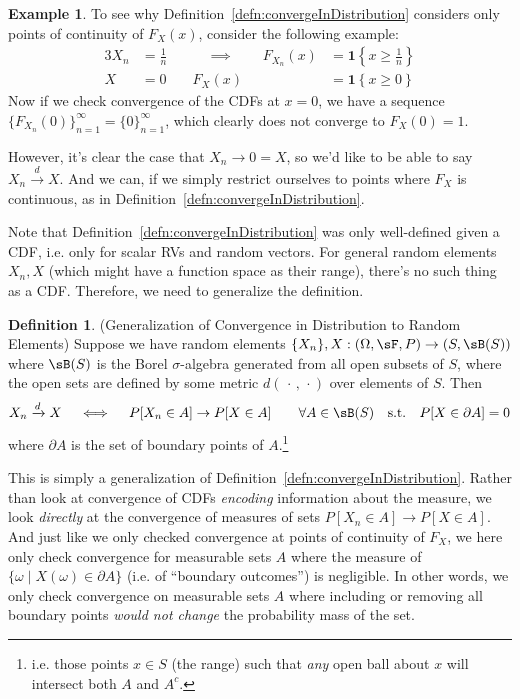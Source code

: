 \documentclass[12pt]{article}
\theoremstyle{plain}
\theoremstyle{definition}
\newtheorem{defn}[thm]{Definition}
\newtheorem{ex}[thm]{Example}
\theoremstyle{remark}
\newcommand{\ra}{\rightarrow}
\newcommand{\dto}{\xrightarrow{d}}
\begin{document}
\begin{ex}
\label{ex:dto}
To see why Definition~\ref{defn:convergeInDistribution} considers only
points of continuity of $F_X(x)$, consider the following example:
\begin{alignat*}{3}
  X_n &= \frac{1}{n}
  &\qquad\implies\qquad
  F_{X_n}(x) &= \mathbf{1}\left\{x\geq \frac{1}{n}\right\}
  \\
  X &= 0
  &\quad
  F_{X}(x) &= \mathbf{1}\left\{x\geq 0\right\}
\end{alignat*}
Now if we check convergence of the CDFs at $x=0$, we have a sequence
$\{F_{X_n}(0)\}_{n=1}^\infty=\{0\}_{n=1}^\infty$, which clearly does not
converge to $F_X(0)=1$.

However, it's clear the case that $X_n\ra 0=X$, so we'd like to be able
to say $X_n\dto X$. And we can, if we simply restrict ourselves to
points where $F_X$ is continuous, as in
Definition~\ref{defn:convergeInDistribution}.
\end{ex}

\clearpage

Note that Definition~\ref{defn:convergeInDistribution} was only
well-defined given a CDF, i.e. only for scalar RVs and random vectors.
For general random elements $X_n,X$ (which might have a function space
as their range), there's no such thing as a CDF. Therefore, we need to
generalize the definition.


\begin{defn}
(Generalization of Convergence in Distribution to Random Elements)
Suppose we have random elements $\{X_n\},X:(\Omega,\sF,P)\ra (S,\sB(S))$
where $\sB(S)$ is the Borel $\sigma$-algebra generated from all open
subsets of $S$, where the open sets are defined by some metric
$d(\,\cdot\,,\,\cdot)$ over elements of $S$.
Then
\begin{align*}
  X_n \dto X
  \quad\iff\quad
  P[X_n\in A] \ra P[X\in A]
  \qquad \forall A \in \sB(S)
  \quad \text{s.t.}
  \quad P[X\in \partial A] = 0
\end{align*}
where $\partial A$ is the set of boundary points of $A$.\footnote{%
  i.e. those points $x\in S$ (the range) such that \emph{any} open ball
  about $x$ will intersect both $A$ and $A^c$.
}

This is simply a generalization of
Definition~\ref{defn:convergeInDistribution}.  Rather than look at
convergence of CDFs \emph{encoding} information about the measure, we
look \emph{directly} at the convergence of measures of sets $P[X_n\in
A]\ra P[X\in A]$.
And just like we only checked convergence at points of continuity of
$F_X$, we here only check convergence for measurable sets $A$ where the
measure of $\{\omega\;|\;X(\omega)\in \partial A\}$ (i.e. of ``boundary
outcomes'') is negligible.
In other words, we only check convergence on measurable sets $A$ where
including or removing all boundary points \emph{would not change} the
probability mass of the set.
\end{defn}
\end{document}
